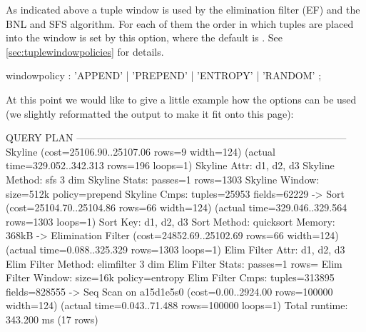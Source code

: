 As indicated above a tuple window is used by the elimination filter
(EF) and the BNL and SFS algorithm. For each of them the order in
which tuples are placed into the window is set by this option, where
the default is . See
\autoref{sec:tuplewindowpolicies} for details.

\begin{rail}
windowpolicy : 'APPEND' | 'PREPEND' | 'ENTROPY' | 'RANDOM' ;
\end{rail}

At this point we would like to give a little example how the options can be
used (we slightly reformatted the output to make it fit onto this page):

\begin{interactive}
 
 
 
 
 
 
 
 
 

                                    QUERY PLAN                                   
---------------------------------------------------------------------------------
 Skyline  (cost=25106.90..25107.06 rows=9 width=124) \prebreak{} 
   \postbreak (actual time=329.052..342.313 rows=196 loops=1) 
   Skyline Attr: d1, d2, d3
   Skyline Method: sfs 3 dim 
   Skyline Stats: passes=1 rows=1303 
   Skyline Window: size=512k policy=prepend 
   Skyline Cmps: tuples=25953 fields=62229 
   ->  Sort  (cost=25104.70..25104.86 rows=66 width=124) \prebreak
         \postbreak (actual time=329.046..329.564 rows=1303 loops=1)
         Sort Key: d1, d2, d3
         Sort Method:  quicksort  Memory: 368kB
         ->  Elimination Filter  (cost=24852.69..25102.69 rows=66 width=124) \prebreak
               \postbreak (actual time=0.088..325.329 rows=1303 loops=1)
               Elim Filter Attr: d1, d2, d3
               Elim Filter Method: elimfilter 3 dim
               Elim Filter Stats: passes=1 rows=
               Elim Filter Window: size=16k policy=entropy 
               Elim Filter Cmps: tuples=313895 fields=828555
               ->  Seq Scan on a15d1e5s0  (cost=0.00..2924.00 rows=100000 \prebreak
                     \postbreak width=124) (actual time=0.043..71.488 rows=100000 loops=1)
 Total runtime: 343.200 ms
(17 rows)
\end{interactive}

